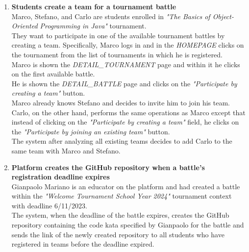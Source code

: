 \begin{enumerate}
		\item \textbf{Students create a team for a tournament battle}\\
Marco, Stefano, and Carlo are students enrolled in \emph{"The Basics of Object-Oriented Programming in Java"} tournament.\\
They want to participate in one of the available tournament battles by creating a team.
Specifically, Marco logs in and in the \emph{HOMEPAGE} clicks on the tournament from the list of tournaments in which he is registered.\\
Marco is shown the \emph{DETAIL\_TOURNAMENT} page and within it he clicks on the first available battle.\\
He is shown the \emph{DETAIL\_BATTLE} page and clicks on the \emph{"Participate by creating a team"} button.\\
Marco already knows Stefano and decides to invite him to join his team.\\
Carlo, on the other hand, performs the same operations as Marco except that instead of clicking on the \emph{"Participate by creating a team"} field, he clicks on the \emph{"Participate by joining an existing team"} button.\\
The system after analyzing all existing teams decides to add Carlo to the same team with Marco and Stefano.
		
		\item \textbf{Platform creates the GitHub repository when a battle's registration deadline expires}\\
Gianpaolo Mariano is an educator on the platform and had created a battle within the \emph{"Welcome Tournament School Year 2024"} tournament context with deadline 6/11/2023.\\
The system, when the deadline of the battle expires, creates the GitHub repository containing the code kata specified by Gianpaolo for the battle and sends the link of the newly created repository to all students who have registered in teams before the deadline expired.



\end{enumerate}

